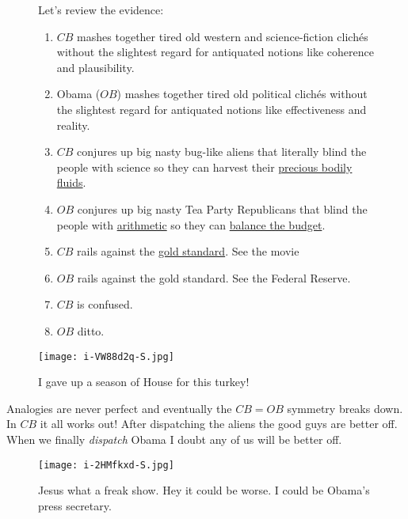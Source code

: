 \captionsetup[figure]{labelformat=empty}
\begin{figure}[ht]
\begin{minipage}[b]{0.65\textwidth}
Let's review the evidence:

\begin{enumerate}
\item
  $CB$ mashes together tired old western and science-fiction clichés
  without the slightest regard for antiquated notions like coherence and
  plausibility.
\item
  Obama ($OB$) mashes together tired old political clichés without the
  slightest regard for antiquated notions like effectiveness and
  reality.
\item
  $CB$ conjures up big nasty bug-like aliens that literally blind the
  people with science so they can harvest their
  \href{http://www.youtube.com/watch?v=N1KvgtEnABY}{precious bodily
  fluids}.
\item
  $OB$ conjures up big nasty Tea Party Republicans that blind the people
  with \href{http://www.ardue.org.uk/world/finarith.html}{arithmetic} so
  they can
  \href{http://www.thedailylink.org/2005/04/good-god-just-balance-fucking-budget.html}{balance
  the budget}.
\item
  $CB$ rails against the
  \href{http://www.econlib.org/library/Enc/GoldStandard.html}{gold
  standard}. See the movie
\item
  $OB$ rails against the gold standard. See the Federal Reserve.
\item
  $CB$ is confused.
\item
  $OB$ ditto.
\end{enumerate}
\end{minipage}
\begin{minipage}[b]{0.35\textwidth}
\centering
\texttt{[image: i-VW88d2q-S.jpg]}
\caption{I gave  up a season of House for this  turkey!}
\label{fig:1698X1}
\end{minipage}
\end{figure}

Analogies are never perfect and eventually the $CB = OB$ symmetry
breaks down. In $CB$ it all works out! After dispatching the aliens the
good guys are better off. When we finally \emph{dispatch} Obama I doubt
any of us will be better off.
\begin{SCfigure}
  \centering
  \texttt{[image: i-2HMfkxd-S.jpg]}
  \caption{Jesus  what a freak show. Hey it could be worse. I could be Obama's press  secretary.}
  \label{fig:1698X2}
\end{SCfigure}

